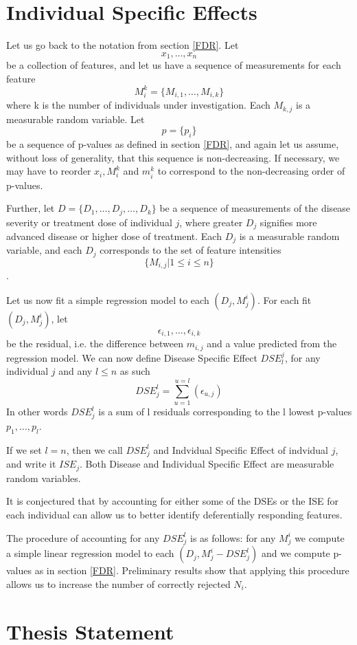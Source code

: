 \section{Individual Specific Effects} \label{ISE}

Let us go back to the notation from section \ref{FDR}. Let $$x_{1}, \ldots, x_{n}$$ be a collection of features, and let us have a sequence of measurements for each feature
$$M^{k}_{i}=\{M_{i,1}, \ldots, M_{i,k}\}$$
where k is the number of individuals under investigation. Each $M_{k, j}$ is a measurable random variable. Let $$p=\{p_{i}\}$$ be a sequence of p-values as defined in section \ref{FDR}, and again let us assume, without loss of generality, that this sequence is non-decreasing. If necessary, we may have to reorder $x_{i}, M_{i}^{k}$ and $m_{i}^{k}$ to correspond to the non-decreasing order of p-values.

Further, let $D=\{D_{1}, \ldots, D_{j}, \ldots, D_{k}\}$ be a sequence of measurements of the disease severity or treatment dose of individual $j$, where greater $D_{j}$ signifies more advanced disease or higher dose of treatment. Each $D_{j}$ is a measurable random variable, and each $D_{j}$ corresponds to the set of feature intensities $$\{M_{i,j} | 1 \leq i \leq n \}$$.

Let us now fit a simple regression model to each $(D_{j}, M^{i}_{j})$. For each fit $(D_{j}, M^{i}_{j})$, let $$\epsilon_{i, 1}, \ldots, \epsilon_{i, k}$$ be the residual, i.e. the difference between $m_{i, j}$ and a value predicted from the regression model. We can now define Disease Specific Effect $DSE^{j}_{l}$, for any individual $j$ and any $l \leq n$ as such
$$DSE^{l}_{j}=\sum^{u=l}_{u=1}(\epsilon_{u,j})$$
In other words $DSE^{l}_{j}$ is a sum of l residuals corresponding to the l lowest p-values $p_{1}, \ldots, p_{l}$.

If we set $l = n$, then we call $DSE^{l}_{j}$ and Indvidual Specific Effect of indvidual $j$, and write it $ISE_{j}$. Both Disease and Individual Specific Effect are measurable random variables.

It is conjectured that by accounting for either some of the DSEs or the ISE for each individual can allow us to better identify deferentially responding features.

The procedure of accounting for any $DSE^{l}_{j}$ is as follows: for any $M^{i}_{j}$ we compute a simple linear regression model to each $(D_{j}, M^{i}_{j} - DSE^{l}_{j})$ and we compute p-values as in section \ref{FDR}. Preliminary results show that applying this procedure allows us to increase the number of correctly rejected $N_{i}$.
\printbibliography

\section{Thesis Statement}
\label{c:intro:thesisstatement}


